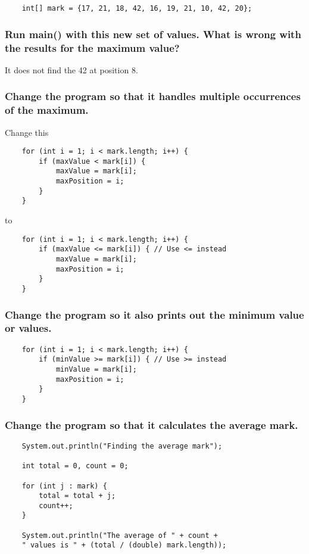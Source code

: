 \documentclass{article}
\begin{document}
    \begin{verbatim}
    int[] mark = {17, 21, 18, 42, 16, 19, 21, 10, 42, 20};
    \end{verbatim}

    \subsubsection{Run main() with this new set of values. What is wrong with the results for the maximum value?}

    It does not find the 42 at position 8.

    \subsubsection{Change the program so that it handles multiple occurrences of the maximum.}

    Change this
    \begin{verbatim}
    for (int i = 1; i < mark.length; i++) {
        if (maxValue < mark[i]) {
            maxValue = mark[i];
            maxPosition = i;
        }
    }
    \end{verbatim}
    to
    \begin{verbatim}
    for (int i = 1; i < mark.length; i++) {
        if (maxValue <= mark[i]) { // Use <= instead
            maxValue = mark[i];
            maxPosition = i;
        }
    }
    \end{verbatim}

    \subsubsection{Change the program so it also prints out the minimum value or values.}

    \begin{verbatim}
    for (int i = 1; i < mark.length; i++) {
        if (minValue >= mark[i]) { // Use >= instead
            minValue = mark[i];
            maxPosition = i;
        }
    }
    \end{verbatim}

    \subsubsection{Change the program so that it calculates the average mark.}

    \begin{verbatim}
    System.out.println("Finding the average mark");

    int total = 0, count = 0;

    for (int j : mark) {
        total = total + j;
        count++;
    }

    System.out.println("The average of " + count +
    " values is " + (total / (double) mark.length));
    \end{verbatim}
\end{document}

